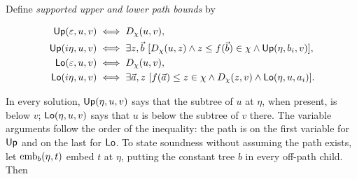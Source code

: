 Define \emph{supported upper and lower path bounds} by

\begin{equation}\label{eq:g22}
\begin{aligned}
 \mathsf{Up}(\varepsilon,u,v)&\iff D_\chi(u,v),\\
 \mathsf{Up}(i\eta,u,v)&\iff
 \exists z,\vec b\ [D_\chi(u,z)\land z\le f(\vec b)\in\chi
 \land\mathsf{Up}(\eta,b_i,v)],\\
 \mathsf{Lo}(\varepsilon,u,v)&\iff D_\chi(u,v),\\
 \mathsf{Lo}(i\eta,u,v)&\iff
 \exists\vec a,z\ [f(\vec a)\le z\in\chi\land D_\chi(z,v)
 \land\mathsf{Lo}(\eta,u,a_i)].
 \end{aligned}
\end{equation}

In every solution, $\mathsf{Up}(\eta,u,v)$ says that the subtree of $u$ at
$\eta$, when present, is below $v$; $\mathsf{Lo}(\eta,u,v)$ says that $u$ is
below the subtree of $v$ there. The variable arguments follow the order of
the inequality: the path is on the first variable for $\mathsf{Up}$ and on the
last for $\mathsf{Lo}$.
To state soundness without assuming the path exists, let
$\operatorname{emb}_b(\eta,t)$ embed $t$ at $\eta$, putting the constant
tree $b$ in every off-path child. Then


